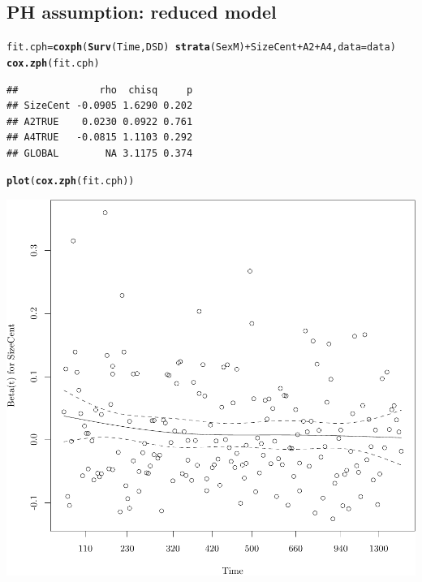 \documentclass{article}\usepackage[]{graphicx}\usepackage[]{color}
\makeatletter
\def\maxwidth{ %
  \ifdim\Gin@nat@width>\linewidth
    \linewidth
  \else
    \Gin@nat@width
  \fi
}
\newcommand{\hlopt}[1]{\textcolor[rgb]{0,0,0}{#1}}%
\newcommand{\hlstd}[1]{\textcolor[rgb]{0.345,0.345,0.345}{#1}}%
\newcommand{\hlkwb}[1]{\textcolor[rgb]{0.69,0.353,0.396}{#1}}%
\newcommand{\hlkwc}[1]{\textcolor[rgb]{0.333,0.667,0.333}{#1}}%
\newcommand{\hlkwd}[1]{\textcolor[rgb]{0.737,0.353,0.396}{\textbf{#1}}}%
\newenvironment{kframe}{%
 \def\at@end@of@kframe{}%
 \ifinner\ifhmode%
  \def\at@end@of@kframe{\end{minipage}}%
  \begin{minipage}{\columnwidth}%
 \fi\fi%
 \def\FrameCommand##1{\hskip\@totalleftmargin \hskip-\fboxsep
 \colorbox{shadecolor}{##1}\hskip-\fboxsep
     \hskip-\linewidth \hskip-\@totalleftmargin \hskip\columnwidth}%
 \MakeFramed {\advance\hsize-\width
   \@totalleftmargin\z@ \linewidth\hsize
   \@setminipage}}%
 {\par\unskip\endMakeFramed%
 \at@end@of@kframe}
\newenvironment{knitrout}{}{} %
\makeatother
\begin{document}
\subsection{PH assumption: reduced model}
\begin{knitrout}
\color{fgcolor}\begin{kframe}
\begin{alltt}
\hlstd{fit.cph} \hlkwb{=} \hlkwd{coxph}\hlstd{(}\hlkwd{Surv}\hlstd{(Time, DSD)} \hlopt{~} \hlkwd{strata}\hlstd{(SexM)} \hlopt{+} \hlstd{SizeCent} \hlopt{+} \hlstd{A2} \hlopt{+} \hlstd{A4,} \hlkwc{data} \hlstd{= data)}
\hlkwd{cox.zph}\hlstd{(fit.cph)}
\end{alltt}
\begin{verbatim}
##              rho  chisq     p
## SizeCent -0.0905 1.6290 0.202
## A2TRUE    0.0230 0.0922 0.761
## A4TRUE   -0.0815 1.1103 0.292
## GLOBAL        NA 3.1175 0.374
\end{verbatim}
\begin{alltt}
\hlkwd{plot}\hlstd{(}\hlkwd{cox.zph}\hlstd{(fit.cph))}
\end{alltt}
\end{kframe}

{\centering \includegraphics[width=\maxwidth]{figure/05-eda-ph-check-reduced-1} 

}





\end{knitrout}
\end{document}
